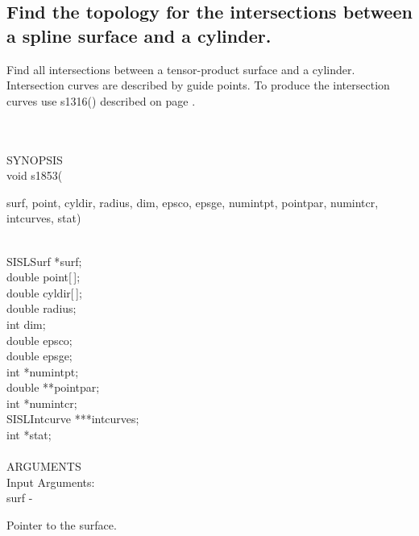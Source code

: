 \subsection{Find the topology for the intersections between a spline surface and a cylinder.}
\begin{minipg1}
  Find all intersections between a tensor-product surface and a cylinder.
  Intersection curves are described by guide points.
  To produce the intersection curves use s1316() described on page \pageref{s1316}.
\end{minipg1} \\ \\
SYNOPSIS\\
        \>void s1853(\begin{minipg3}
                        {\fov surf}, {\fov point}, {\fov cyldir}, {\fov radius}, {\fov dim}, {\fov epsco},
                        {\fov epsge}, {\fov numintpt}, \linebreak
                        {\fov pointpar}, {\fov numintcr}, {\fov intcurves}, {\fov stat})
                \end{minipg3}\\[0.3ex]
                \>\>    SISLSurf        \>      *{\fov surf};\\
                \>\>    double  \>      {\fov point}[\,];\\
                \>\>    double  \>      {\fov cyldir}[\,];\\
                \>\>    double  \>      {\fov radius};\\
                \>\>    int     \>      {\fov dim};\\
                \>\>    double  \>      {\fov epsco};\\
                \>\>    double  \>      {\fov epsge};\\
                \>\>    int     \>      *{\fov numintpt};\\
                \>\>    double  \>      **{\fov pointpar};\\
                \>\>    int     \>      *{\fov numintcr};\\
                \>\>    SISLIntcurve\>  ***{\fov intcurves};\\
                \>\>    int     \>      *{\fov stat};\\
\\
ARGUMENTS\\
        \>Input Arguments:\\
        \>\>    {\fov surf}\> - \>      \begin{minipg2}
                                Pointer to the surface.
                                \end{minipg2}\\

